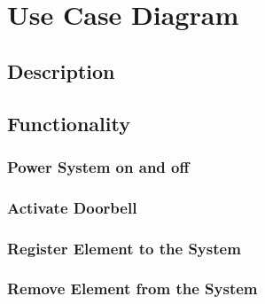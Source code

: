 \chapter{Use Case Diagram}

\section{Description}

\section{Functionality}

\subsection{Power System on and off}

\subsection{Activate Doorbell}

\subsection{Register Element to the System}

\subsection{Remove Element from the System}